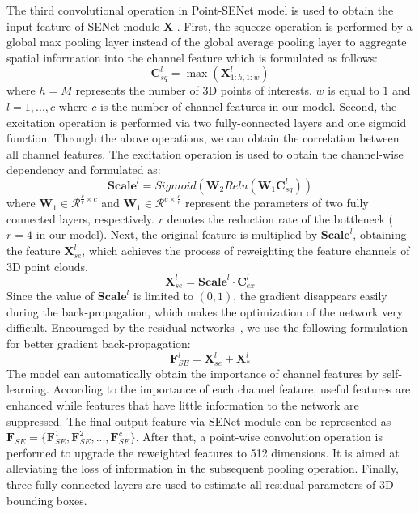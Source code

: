 \documentclass[letterpaper]{article} %
\begin{document}
The third convolutional operation in Point-SENet model is used to obtain the input feature of SENet module $\mathbf{X}$ . First, the squeeze operation is performed by a global max pooling layer instead of the global average pooling layer to aggregate spatial information into the channel feature which is formulated as follows:
\begin{equation}
\mathbf{C}_{sq}^l = \max (\mathbf{X}_{1:h,1:w}^l)
\end{equation}
where $h=M$ represents the number of 3D points of interests. $w$ is equal to $1$ and $l={1,...,c}$ where $c$ is the number of channel features in our model. Second, the excitation operation is performed via  two fully-connected layers and one sigmoid function. Through the above operations, we can obtain the correlation between all channel features. The excitation operation is used to obtain the channel-wise dependency and formulated as:
\begin{equation}
\mathbf{Scale}^l = Sigmoid(\mathbf{W}_2Relu(\mathbf{W}_1\mathbf{C}_{sq}^l))
\end{equation}
where $\mathbf{W}_1 \in \mathcal{R}^{\frac{c}{r}\times{c}}$  and $\mathbf{W}_1 \in \mathcal{R}^{c \times \frac{c}{r}}$ represent the parameters of two fully connected layers, respectively. $r$ denotes the reduction rate of the bottleneck ($r=4$ in our model). Next, the original feature is multiplied by $\mathbf{Scale}^l$, obtaining the feature $\mathbf{X}_{se}^l$, which achieves the process of reweighting the feature channels of 3D point clouds.
\begin{equation}
\mathbf{X}_{se}^l = \mathbf{Scale}^l \cdot \mathbf{C}_{ex}^l
\end{equation}
Since the value of $\mathbf{Scale}^l$ is limited to $(0,1)$, the gradient disappears easily during the back-propagation, which makes the optimization of the network very difficult. Encouraged by the residual networks~\cite{he2016deep}, we use the following formulation for better gradient back-propagation:
\begin{equation}
\mathbf{F}_{SE}^l = \mathbf{X}_{se}^l + \mathbf{X}_*^l
\end{equation}
The model can automatically obtain the importance of channel features by self-learning. According to the importance of each channel feature, useful features are enhanced while features that have little information to the network are suppressed. The final output feature via SENet module can be represented as $\mathbf{F}_{SE} = \{\mathbf{F}_{SE}^1,\mathbf{F}_{SE}^2,...,\mathbf{F}_{SE}^c\}$.
After that, a point-wise convolution operation is performed to upgrade the reweighted features to 512 dimensions. It is aimed at alleviating the loss of information in the subsequent pooling operation. Finally, three fully-connected layers are used to estimate all residual parameters of 3D bounding boxes.
\end{document}
